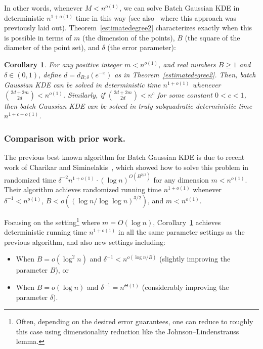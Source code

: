 \documentclass[10pt,a4paper]{article}
\theoremstyle{plain}\newtheorem{theorem}{Theorem}
\newtheorem{corollary}[theorem]{Corollary}
\theoremstyle{definition}
\begin{document}
In other words, whenever $M < n^{o(1)}$, we can solve Batch Gaussian KDE in deterministic $n^{1+o(1)}$ time in this way (see also~\cite[Section~5.3]{alman2020algorithms} where this approach was previously laid out). Theorem~\ref{estimatedegree2} characterizes exactly when this is possible in terms of $m$ (the dimension of the points), $B$ (the square of the diameter of the point set), and $\delta$ (the error parameter):

\begin{corollary} \label{kdecorr}
For any positive integer $m  < n^{o(1)}$, and real numbers $B \geq 1$ and $\delta \in (0,1)$, define $d = d_{B; \delta} (e^{-x})$ as in Theorem~\ref{estimatedegree2}. 
Then, batch Gaussian KDE can be solved in deterministic time $n^{1+o(1)}$ whenever $\binom{2d+2m}{2d} < n^{o(1)}$.
Similarly, if $\binom{2d+2m}{2d} < n^{c}$ for some constant $0 < c < 1$, then batch Gaussian KDE can be solved in truly subquadratic deterministic time $n^{1 + c + o(1)}$.
\end{corollary}

\subsubsection{Comparison with prior work.}\label{subsec:1} The previous best known algorithm for Batch Gaussian KDE is due to recent work of Charikar and Siminelakis~\cite{charikar2017hashing}, which showed how to solve this problem in randomized time $\delta^{-2} n^{1+o(1)} \cdot (\log n)^{O(B^{2/3})}$ for any dimension $m < n^{o(1)}$. Their algorithm achieves randomized running time $n^{1+o(1)}$ whenever $\delta^{-1} < n^{o(1)}$, $B < o((\log n / \log\log n)^{3/2})$, and $m < n^{o(1)}$. 

Focusing on the setting\footnote{Often, depending on the desired error guarantees, one can reduce to roughly this case using dimensionality reduction like the Johnson–Lindenstrauss lemma.} where $m = O(\log n)$, Corollary~\ref{kdecorr} achieves deterministic running time $n^{1+o(1)}$ in all the same parameter settings as the previous algorithm, and also new settings including:
\begin{itemize}
    \item When $B = o(\log^2 n)$ and $\delta^{-1} < n^{o(\log n / B)}$ (slightly improving the parameter $B$), or
    \item When $B = o(\log n)$ and $\delta^{-1} = n^{\Theta(1)}$ (considerably improving the parameter $\delta$).
\end{itemize}
\end{document}
